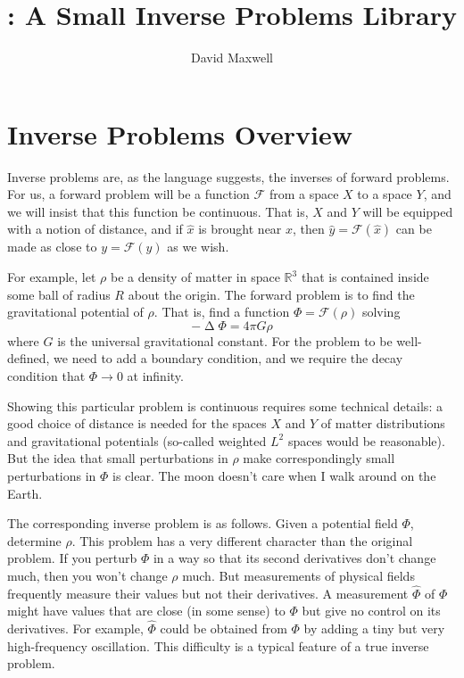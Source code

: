 \documentclass[12pt]{article}
\title{\siple: A Small Inverse Problems Library}
\author{David Maxwell}
\newcommand{\calF}{\mathcal{F}}
\newcommand{\Reals}{\mathbb{R}}
\DeclareMathOperator{\Laplacian}{\Delta}
\let\ra\rightarrow
\begin{document}
\maketitle

\section{Inverse Problems Overview}

Inverse problems are, as the language suggests, the inverses of forward problems. For us, a forward problem will be a function $\calF$ 
from a space $X$ to a space $Y$, and we will insist that this function be continuous.  That is, $X$ and $Y$ will be equipped with a notion of distance, and if $\hat x$ is brought near $x$, then $\hat y=\calF(\hat x)$ can be made as close to $y=\calF(y)$ as we wish.  

For example, let $\rho$ be a density of matter in space $\Reals^3$ that
is contained inside some ball of radius $R$ about the origin. The forward 
problem is to find the gravitational potential of $\rho$.  That is, find
a function $\Phi=\calF(\rho)$ solving
\begin{equation}
-\Laplacian \Phi = 4\pi G \rho
\end{equation}
where $G$ is the universal gravitational constant.  For the problem
to be well-defined, we need to add a boundary condition, and we
require the decay condition that $\Phi\ra 0$ at infinity.  

Showing this  particular problem is continuous requires some technical details: a good choice of distance is needed for the spaces $X$ and $Y$ of matter distributions and gravitational potentials (so-called weighted $L^2$ spaces would be reasonable).  But the idea that small perturbations in $\rho$ make correspondingly small perturbations in $\Phi$ is clear.  The moon doesn't care when I walk around on the Earth.

The corresponding inverse problem is as follows.  Given a potential field $\Phi$, determine $\rho$.  This problem has a very different character than the original problem.  If you perturb $\Phi$ in a way so that its second derivatives don't change much, then you won't change $\rho$ much.  
But measurements of physical fields frequently measure their values but not their derivatives.  A measurement $\hat \Phi$ of $\Phi$ might have values that are close (in some sense) to $\Phi$ but give no control on its derivatives.
For example, $\hat \Phi$ could be obtained from $\Phi$ by adding a tiny but very high-frequency oscillation.  This difficulty is a typical feature of a true inverse problem.
\end{document}
